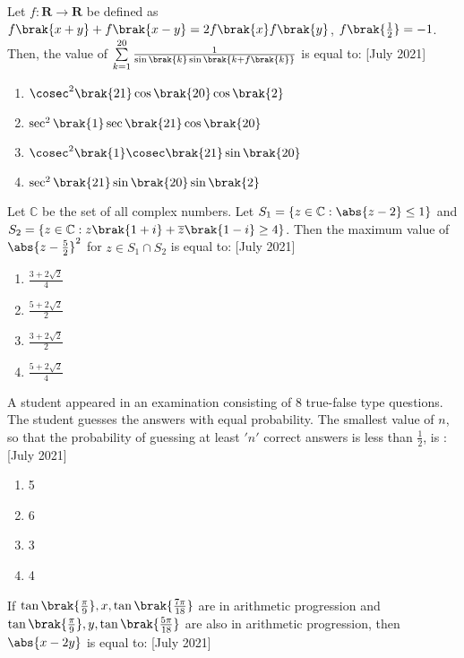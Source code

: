  \item Let $f:\textbf{R}\rightarrow\textbf{R}$ be defined as $f\brak{x+y} + f\brak{x-y} = 2f\brak{x}f\brak{y}$, $f\brak{\frac{1}{2}} = -1$. Then, the value of $\sum\limits_{k=1}^{20}\frac{1}{\sin{\brak{k}}\sin{\brak{k + f\brak{k}}}}$ is equal to: \hfill[July 2021]
 \begin{enumerate}
     \item $\cosec^{2}\brak{21}\cos\brak{20}\cos\brak{2}$
     \item $\sec^{2}\brak{1}\sec\brak{21}\cos\brak{20}$
     \item $\cosec^{2}\brak{1}\cosec\brak{21}\sin\brak{20}$
     \item $\sec^{2}\brak{21}\sin\brak{20}\sin\brak{2}$\\
 \end{enumerate}
\item Let $\mathbb{C}$ be the set of all complex numbers. Let $S_1 = \left\{z\in\mathbb{C}:\abs{z-2} \leq 1\right\}$ and $S_2 = \left\{z\in\mathbb{C}:z\brak{1+i} + \overline{z}\brak{1-i} \geq 4\right\}$. Then the maximum value of $\abs{z-\frac{5}{2}}^{2}$ for $z \in S_1 \cap S_2$ is equal to: \hfill[July 2021]
\begin{enumerate}
    \item $\frac{3 + 2\sqrt{2}}{4}$
    \item $\frac{5 + 2\sqrt{2}}{2}$
    \item $\frac{3 + 2\sqrt{2}}{2}$
    \item $\frac{5 + 2\sqrt{2}}{4}$\\
\end{enumerate}
\item  A student appeared in an examination consisting of 8 true-false type questions. The student guesses the answers with equal probability. The smallest value of $n$, so that the probability of guessing at least $'n'$ correct answers is less than $\frac{1}{2}$, is : \hfill[July 2021]
\begin{enumerate}
    \item 5
    \item 6
    \item 3
    \item 4 \\
\end{enumerate}
\item If $\tan\brak{\frac{\pi}{9}}, x, \tan\brak{\frac{7\pi}{18}}$ are in arithmetic progression and $\tan\brak{\frac{\pi}{9}}, y, \tan\brak{\frac{5\pi}{18}}$ are also in arithmetic progression, then $\abs{x - 2y}$ is equal to: \hfill[July 2021]
